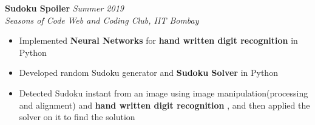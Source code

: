 \documentclass{article}
\begin{document}
\vspace{\baselineskip}
\vspace{-10pt}
\noindent\textbf{Sudoku Spoiler} \hfill{\sl \small Summer 2019}\\
{\it Seasons of Code } \hfill{\it Web and Coding Club, IIT Bombay}
\vspace{-3pt}
\begin{itemize}[itemsep = -0.75 mm, leftmargin=*]
\item Implemented {\bf Neural Networks} for {\bf hand written digit recognition} in Python
\item Developed random Sudoku generator and {\bf Sudoku Solver} in Python
\item Detected Sudoku instant from an image using image manipulation(processing and alignment) and {\bf hand written digit recognition} , and then applied the solver on it to find the solution
\end{itemize}
\vspace{-4pt}
\end{document}
